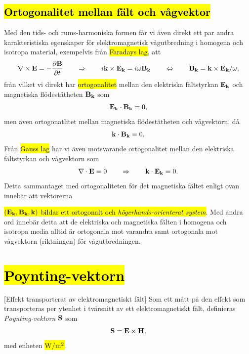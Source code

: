 {{{{{\subsection{{\hl{Ortogonalitet mellan f{\"a}lt och v{\aa}gvektor}}}
Med den tids- och rums-harmoniska formen f{\aa}r vi {\"a}ven direkt ett par
andra karakteristiska egenskaper f{\"o}r elektromagnetisk v{\aa}gutbredning i
homogena och isotropa material, exempelvis fr{\aa}n {\hl{Faradays lag}}, att
\hl{$$
  \nabla\times{\bf E}=-{{\partial{\bf B}}\over{\partial t}}
  \qquad\Rightarrow\qquad
  i{\bf k}\times{\bf E}_{\bf k} = i\omega{\bf B}_{\bf k}
  \qquad\Leftrightarrow\qquad
  {\bf B}_{\bf k}={\bf k}\times{\bf E}_{\bf k}/\omega,
$$}
fr{\aa}n vilket vi direkt har {\hl{ortogonalitet}} mellan den elektriska
f{\"a}ltstyrkan ${\bf E}_{\bf k}$ och magnetiska fl{\"o}des\-t{\"a}t\-heten
${\bf B}_{\bf k}$ som
\hl{$$
  {\bf E}_{\bf k}\cdot{\bf B}_{\bf k}=0,
$$}
men {\"a}ven ortogonatlitet mellan magnetiska fl{\"o}dest{\"a}theten och
v{\aa}gvektorn, d{\aa}
\hl{$$
  {\bf k}\cdot{\bf B}_{\bf k}=0.
$$}
Fr{\aa}n {\hl{Gauss lag}}
har vi {\"a}ven motsvarande ortogonalitet mellan den elektriska f{\"a}ltstyrkan
och v{\aa}gvektorn som
\hl{$$
  \nabla\cdot{\bf E}=0
  \qquad\Rightarrow\qquad
  {\bf k}\cdot{\bf E}_{\bf k}=0.
$$}
Detta sammantaget med ortogonaliteten f{\"o}r det magnetiska f{\"a}ltet enligt
ovan inneb{\"a}r att vektorerna {\hl{$({\bf E}_{\bf k},{\bf B}_{\bf k},{\bf k})$
bildar ett ortogonalt och {\it h{\"o}gerhands-orienterat system}}.
Med andra ord inneb{\"a}r detta att de elektriska och magnetiska f{\"a}lten i
homogena och isotropa media alltid {\"a}r ortogonala mot varandra samt
ortogonala mot v{\aa}gvektorn (riktningen) f{\"o}r v{\aa}gutbredningen.

\section{{\hl{Poynting-vektorn}}}
[Effekt transporterat av elektromagnetiskt
  f{\"a}lt]
Som ett m{\aa}tt p{\aa} den effekt som transporteras per ytenhet i
tv{\"a}rsnitt av ett elektromagnetiskt f{\"a}lt, definieras
{\it Poynting-vektorn} ${\bf S}$ som
\hl{$$
  {\bf S}={\bf E}\times{\bf H},
$$}
med enheten {\hl{${\rm W}/{\rm m}^2$}}.
\vfill\eject

}}}}}}
